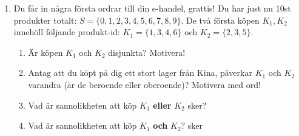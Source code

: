 \documentclass[a4paper,10pt]{article}
\begin{document}
\begin{enumerate}
\begin{enumerate}
    \end{enumerate}
  \newpage
  \item{Du får in några första ordrar till din e-handel, grattis! Du har just nu 10st produkter totalt: $S=\{0, 1, 2, 3, 4, 5, 6, 7, 8, 9\}$. De två första köpen $K_1, K_2$ innehöll följande produkt-id: $K_1=\{1, 3, 4, 6\}$ och $K_2=\{2, 3, 5\}$.}
    \begin{enumerate}
      \item{Är köpen $K_1$ och $K_2$ disjunkta? Motivera!}
      \vspace{3cm}
      \item{Antag att du köpt på dig ett stort lager från Kina, påverkar $K_1$ och $K_2$ varandra (är de beroende eller oberoende)? Motivera med ord!}
      \vspace{3cm}
      \item{Vad är sannolikheten att köp $K_1$ {\bf eller} $K_2$ sker?}
      \vspace{6cm}
      \item{Vad är sannolikheten att köp $K_1$ {\bf och} $K_2$? sker}
    \end{enumerate}
\end{enumerate}
\vfill
\end{document}
